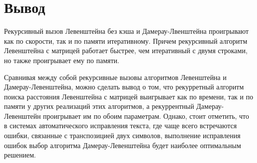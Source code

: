 \section*{Вывод}
Рекурсивный вызов Левенштейна без кэша и Дамерау-Лвенштейна проигрывают как по скорости, так и по памяти итеративному. Причем рекурсивный алгоритм Левенштейна с матрицей работает быстрее, чем итеративный с двумя строками, но также проигрывает ему по памяти.

Сравнивая между собой рекурсивные вызовы алгоритмов Левенштейна и Дамерау-Левенштейна, можно сделать вывод о том, что рекурретный алгоритм поиска расстояния Левенштейна с матрицей выигрывает как по времени, так и по памяти у других реализаций этих алгоритмов, а рекуррентный Дамерау-Левенштейн проигрывает им по обоим параметрам. Однако, стоит отметить, что в системах автоматического исправления текста, где чаще всего встречаются ошибки, связанные с транспозицией двух символов, выполнение исправления ошибок выбор алгоритма Дамерау-Левенштейна будет наиболее оптимальным решением.\\